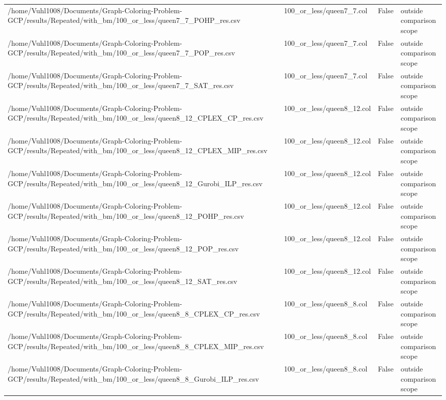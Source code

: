 \begin{table}[htbp]
\begin{tabular}{llll}
/home/Vuhl1008/Documents/Graph-Coloring-Problem-GCP/results/Repeated/with\_bm/100\_or\_less/queen7\_7\_POHP\_res.csv & 100\_or\_less/queen7\_7.col & False & outside comparison scope \\
/home/Vuhl1008/Documents/Graph-Coloring-Problem-GCP/results/Repeated/with\_bm/100\_or\_less/queen7\_7\_POP\_res.csv & 100\_or\_less/queen7\_7.col & False & outside comparison scope \\
/home/Vuhl1008/Documents/Graph-Coloring-Problem-GCP/results/Repeated/with\_bm/100\_or\_less/queen7\_7\_SAT\_res.csv & 100\_or\_less/queen7\_7.col & False & outside comparison scope \\
/home/Vuhl1008/Documents/Graph-Coloring-Problem-GCP/results/Repeated/with\_bm/100\_or\_less/queen8\_12\_CPLEX\_CP\_res.csv & 100\_or\_less/queen8\_12.col & False & outside comparison scope \\
/home/Vuhl1008/Documents/Graph-Coloring-Problem-GCP/results/Repeated/with\_bm/100\_or\_less/queen8\_12\_CPLEX\_MIP\_res.csv & 100\_or\_less/queen8\_12.col & False & outside comparison scope \\
/home/Vuhl1008/Documents/Graph-Coloring-Problem-GCP/results/Repeated/with\_bm/100\_or\_less/queen8\_12\_Gurobi\_ILP\_res.csv & 100\_or\_less/queen8\_12.col & False & outside comparison scope \\
/home/Vuhl1008/Documents/Graph-Coloring-Problem-GCP/results/Repeated/with\_bm/100\_or\_less/queen8\_12\_POHP\_res.csv & 100\_or\_less/queen8\_12.col & False & outside comparison scope \\
/home/Vuhl1008/Documents/Graph-Coloring-Problem-GCP/results/Repeated/with\_bm/100\_or\_less/queen8\_12\_POP\_res.csv & 100\_or\_less/queen8\_12.col & False & outside comparison scope \\
/home/Vuhl1008/Documents/Graph-Coloring-Problem-GCP/results/Repeated/with\_bm/100\_or\_less/queen8\_12\_SAT\_res.csv & 100\_or\_less/queen8\_12.col & False & outside comparison scope \\
/home/Vuhl1008/Documents/Graph-Coloring-Problem-GCP/results/Repeated/with\_bm/100\_or\_less/queen8\_8\_CPLEX\_CP\_res.csv & 100\_or\_less/queen8\_8.col & False & outside comparison scope \\
/home/Vuhl1008/Documents/Graph-Coloring-Problem-GCP/results/Repeated/with\_bm/100\_or\_less/queen8\_8\_CPLEX\_MIP\_res.csv & 100\_or\_less/queen8\_8.col & False & outside comparison scope \\
/home/Vuhl1008/Documents/Graph-Coloring-Problem-GCP/results/Repeated/with\_bm/100\_or\_less/queen8\_8\_Gurobi\_ILP\_res.csv & 100\_or\_less/queen8\_8.col & False & outside comparison scope \\

\end{tabular}
\end{table}
